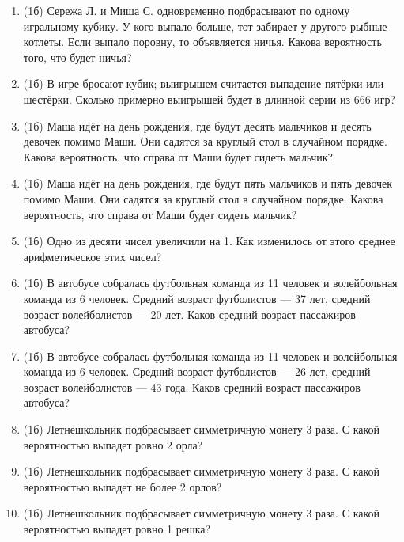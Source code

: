 \documentclass[a4paper, 12pt]{article}
\begin{document}



\begin{enumerate}
\item (1б) Сережа Л. и Миша С. одновременно подбрасывают по одному игральному кубику. У кого выпало больше, тот забирает у другого рыбные котлеты. 
Если выпало поровну, то объявляется ничья. Какова вероятность того, что будет ничья? 

\item (1б) В игре бросают кубик; выигрышем считается выпадение пятёрки или шестёрки. Сколько примерно выигрышей будет в длинной серии из 666 игр?


\item (1б) Маша идёт на день рождения, где будут десять мальчиков и десять девочек помимо Маши. Они садятся за круглый стол в случайном порядке. 
Какова вероятность, что справа от Маши будет сидеть мальчик?

\item (1б) Маша идёт на день рождения, где будут пять мальчиков и пять девочек помимо Маши. Они садятся за круглый стол в случайном порядке. 
Какова вероятность, что справа от Маши будет сидеть мальчик?

\item (1б) Одно из десяти чисел увеличили на 1. Как изменилось от этого среднее арифметическое этих чисел?

\item (1б) В автобусе собралась футбольная команда из 11 человек и волейбольная команда из 6 человек. Средний возраст футболистов — 37 лет, 
средний возраст волейболистов — 20 лет. Каков средний возраст пассажиров автобуса?

\item (1б) В автобусе собралась футбольная команда из 11 человек и волейбольная команда из 6 человек. Средний возраст футболистов — 26 лет, 
средний возраст волейболистов — 43 года. Каков средний возраст пассажиров автобуса?

\item (1б) Летнешкольник подбрасывает симметричную монету 3 раза. С какой вероятностью выпадет ровно 2 орла?

\item (1б) Летнешкольник подбрасывает симметричную монету 3 раза. С какой вероятностью выпадет не более 2 орлов?

\item (1б) Летнешкольник подбрасывает симметричную монету 3 раза. С какой вероятностью выпадет ровно 1 решка?


\end{enumerate}
\end{document}
